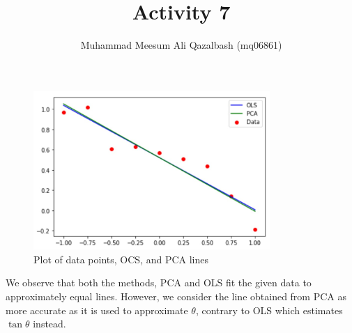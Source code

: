 \documentclass{article}
\title{Activity 7}
\author{Muhammad Meesum Ali Qazalbash (mq06861)}
\theoremstyle{mytheoremstyle}
\theoremstyle{mytheoremstyle}
\theoremstyle{myproblemstyle}
\begin{document}
\maketitle


\begin{figure}
	\centering
	\includegraphics[width=0.8\textwidth]{WhatsApp Image 2022-11-09 at 11.30.53 PM.jpeg}
	\caption{Plot of data points, OCS, and PCA lines}
	\label{fig:plot}
\end{figure}

We observe that both the methods, PCA and OLS fit the given data to approximately equal lines. However, we consider the line obtained from PCA as more accurate as it is used to approximate \(\theta\), contrary to OLS which estimates \(\tan{\theta}\) instead.
\end{document}
